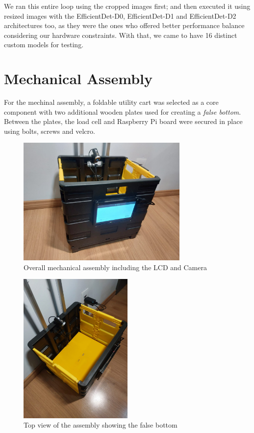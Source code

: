 \documentclass[openright]{normas-utf-tex} %
\begin{document}
We ran this entire loop using the cropped images first; and then executed it using resized images with the EfficientDet-D0,
EfficientDet-D1 and EfficientDet-D2 architectures too, as they were the ones who offered better
performance balance considering our hardware constraints. 
With that, we came to have 16 distinct custom models for testing. 

\section{Mechanical Assembly}

For the mechinal assembly, a foldable utility cart was selected as a core
component with two additional wooden plates used for creating a \textit{false
bottom}. Between the plates, the load cell and Raspberry Pi board were secured
in place using bolts, screws and velcro.

\begin{figure}[H]
	\centering
	\includegraphics[width=0.75\textwidth]{./images/cart.jpeg}
	\caption[Overall mechanical assembly including the LCD and Camera]{Overall mechanical assembly including the LCD and Camera}
\end{figure}

\begin{figure}[H]
	\centering
	\includegraphics[width=0.5\textwidth]{./images/carttop.jpeg}
	\caption[Top view of the assembly showing the false bottom]{Top view of the assembly showing the false bottom}
\end{figure}
\end{document}
